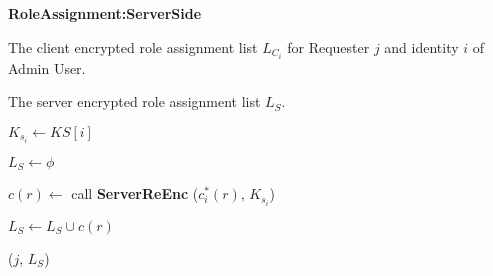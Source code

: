 \documentclass[final,5p,times,twocolumn]{elsarticle}
\newcommand{\algofontsize}{\fontsize{7}{8}\selectfont}
\begin{document}
\begin{algorithm}[htp]
{\algofontsize
\caption{\textbf{RoleAssignment:ServerSide}}

\label{algo:deploy-role-assignment-server-side}

\begin{algorithmic}[1]

\REQUIRE The client encrypted role assignment list $L_{C_i}$ for Requester $j$ and identity $i$ of Admin User.

\ENSURE The server encrypted role assignment list $L_{S}$.

\medskip

\STATE $K_{s_i} \leftarrow KS[i]$ {\algofontsize {}} \label{line:deploy-ra-ss-ks}

\STATE $L_{S} \leftarrow \phi$ \label{line:deploy-ra-ss-init}

 \label{line:deploy-ra-ss-loop}

	\STATE $c(r) \leftarrow$ call \textbf{ServerReEnc} ($c^*_i (r)$, $K_{s_i}$) {\algofontsize {}} \label{line:deploy-ra-ss-call}
	
	\STATE $L_{S} \leftarrow L_{S} \cup c(r)$ \label{line:deploy-ra-ss-update}

\ENDFOR

\RETURN ($j$, $L_{S}$)

\end{algorithmic}
}
\end{algorithm}
\end{document}
